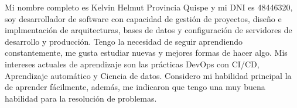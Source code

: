 
\begin{minipage}[t]{0.4\textwidth} %
	\vspace{-\baselineskip} %
	Mi nombre completo es Kelvin Helmut Provincia Quispe y mi DNI es 48446320, soy desarrollador de software con capacidad de gestión de proyectos, diseño e implmentación de arquitecturas, bases de datos y configuración de servidores de desarrollo y producción. Tengo la necesidad de seguir aprendiendo constantemente, me gusta estudiar nuevas y mejores formas de hacer algo. Mis intereses actuales de aprendizaje son las prácticas DevOps con CI/CD, Aprendizaje automático y Ciencia de datos. Considero mi habilidad principal la de aprender fácilmente, además, me indicaron que tengo una muy buena habilidad para la resolución de problemas.
\end{minipage}
\hfill %
\begin{minipage}[t]{0.5\textwidth} %
	\vspace{-\baselineskip} %
	\begin{barchart}{5.5}
	\end{barchart}
\end{minipage}

\begin{center}
\end{center}
